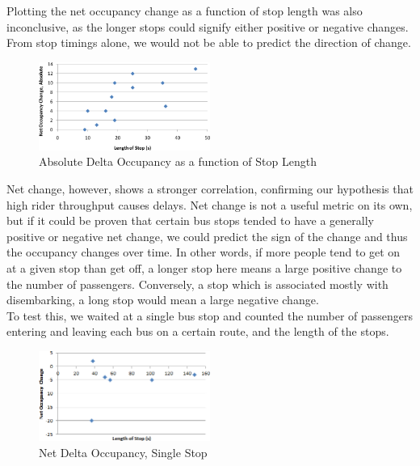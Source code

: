 \documentclass[11pt,journal,compsoc]{IEEEtran} %
\begin{document}
	Plotting the net occupancy change as a function of stop length was also inconclusive, as the longer stops could signify either positive or negative changes.
	From stop timings alone, we would not be able to predict the direction of change.

	\begin{figure}[!t]
	  \includegraphics[width=0.5\textwidth]{absdelta}
      \caption{Absolute Delta Occupancy as a function of Stop Length}
	\end{figure}

	Net change, however, shows a stronger correlation, confirming our hypothesis that high rider throughput causes delays. %
    Net change is not a useful metric on its own, but if it could be proven that certain bus stops tended to have a generally positive or negative net change, we could predict the sign of the change and thus the occupancy changes over time.
	In other words, if more people tend to get on at a given stop than get off, a longer stop here means a large positive change to the number of passengers.
	Conversely, a stop which is associated mostly with disembarking, a long stop would mean a large negative change.
\\
	To test this, we waited at a single bus stop and counted the number of passengers entering and leaving each bus on a certain route, and the length of the stops.

	\begin{figure}[!t]
	  \includegraphics[width=0.5\textwidth]{onestopcrop}
      \caption{Net Delta Occupancy, Single Stop}
	\end{figure}
\end{document}
